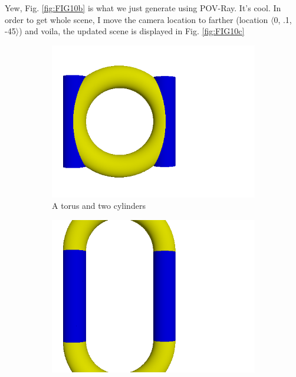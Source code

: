 \documentclass[fleqn,10pt]{wlscirep}
\newcommand*{\PV}{POV-Ray}
\begin{document}
Yew, Fig. \ref{fig:FIG10b} is what we just generate using \PV. It's cool. In order to get whole scene, I move the camera location to farther (location $\langle$0, .1, -45$\rangle$) and voila, the updated scene is displayed in Fig. \ref{fig:FIG10c}

\begin{figure}
\begin{subfigure}{0.31\textwidth}
\includegraphics[width=\linewidth]{FIG10a}
\caption{A torus and two cylinders} \label{fig:FIG10a}
\end{subfigure}
\hspace*{\fill} %
\begin{subfigure}{0.31\textwidth}
\includegraphics[width=\linewidth]{FIG10b}

\end{subfigure}
\end{figure}
\end{document}
